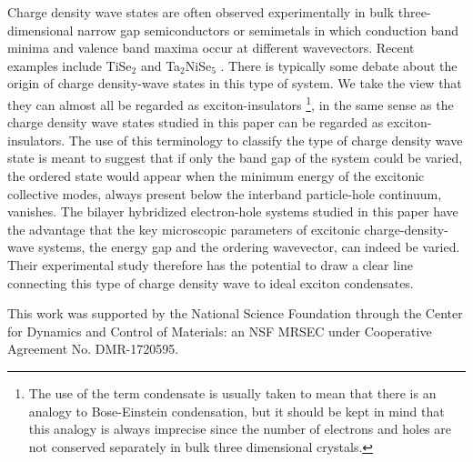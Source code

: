 \documentclass[reprint,aps,superscriptaddress]{revtex4-2}
\begin{document}
Charge density wave states are often observed experimentally in bulk three-dimensional 
narrow gap semiconductors or semimetals in which conduction band minima and valence band maxima 
occur at different wavevectors.  Recent examples include TiSe$_2$ and Ta$_2$NiSe$_5$ \cite{cercellier2007evidence,kogar2017signatures,seki2014excitonic,lu2017zero}.  There is typically 
some debate about the origin of charge density-wave states in this type of system.  We take the view that 
they can almost all be regarded as exciton-insulators \footnote{The use of the term condensate is usually taken to mean
that there is an analogy to Bose-Einstein condensation, but it should be kept in mind that this analogy is always 
imprecise since the number of electrons and holes are not conserved separately in bulk three dimensional crystals.}, in the 
same sense as the charge density wave states studied in this paper can be regarded as exciton-insulators.  
The use of this terminology to classify the type of charge density wave state is meant to suggest that if only
the band gap of the system could be varied, the ordered state would appear when the minimum 
energy of the excitonic collective modes, always present
below the interband particle-hole continuum, vanishes.  The bilayer hybridized electron-hole systems studied 
in this paper have the advantage that the key microscopic parameters of excitonic charge-density-wave systems,
the energy gap and the ordering wavevector, can indeed be varied.  Their experimental study 
therefore has the potential to draw a clear line connecting this type of charge density wave to 
ideal exciton condensates.

\begin{acknowledgements}
This work was supported by the National Science Foundation through the Center for Dynamics and Control of Materials: an NSF MRSEC under Cooperative Agreement No. DMR-1720595.
\end{acknowledgements}


\end{document}

